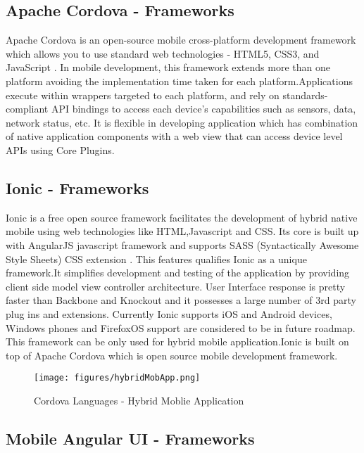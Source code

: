\subsection{Apache Cordova - Frameworks}
              
              Apache Cordova is an open-source mobile cross-platform development framework which allows you to use standard web technologies - HTML5, CSS3, and JavaScript . In mobile development, this framework extends more than one platform avoiding the implementation time taken for each platform.Applications execute within wrappers targeted to each platform, and rely on standards-compliant API bindings to access each device's capabilities such as sensors, data, network status, etc. It is flexible in developing application which has combination of native application components with a web view that can access device level APIs using Core Plugins.           
            	
\subsection{Ionic - Frameworks}		
              
              Ionic is a free open source framework facilitates the development of hybrid native mobile using web technologies like HTML,Javascript and CSS. Its core is built up with AngularJS javascript framework and supports SASS (Syntactically Awesome Style Sheets) CSS extension . This features qualifies Ionic as a unique framework.It simplifies development and testing of the application by providing client side model view controller architecture. User Interface response is pretty faster than Backbone and Knockout and it possesses a large number of 3rd party plug ins and extensions. Currently Ionic supports iOS and Android devices, Windows phones and FirefoxOS support are considered to be in future roadmap. This framework can be only used for hybrid mobile application.Ionic is built on top of Apache Cordova which is open source mobile development framework.
              

\begin{figure}[!htb]
  \texttt{[image: figures/hybridMobApp.png]}
	 \caption{Cordova Languages - Hybrid Moblie Application }
  \label{fig: Cordova Languages - Hybrid Moblie Application}
\end{figure}		 

   
\subsection{Mobile Angular UI - Frameworks}     
			
